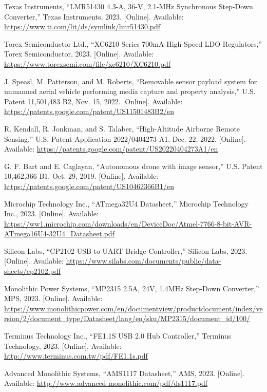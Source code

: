\documentclass[12pt]{article}
\begin{document}
\begin{thebibliography}{99}
Texas Instruments, ``LMR51430 4.3-A, 36-V, 2.1-MHz Synchronous Step-Down Converter,'' Texas Instruments, 2023. [Online]. Available: \url{https://www.ti.com/lit/ds/symlink/lmr51430.pdf}

Torex Semiconductor Ltd., ``XC6210 Series 700mA High-Speed LDO Regulators,'' Torex Semiconductor, 2023. [Online]. Available: \url{https://www.torexsemi.com/file/xc6210/XC6210.pdf}

J. Speasl, M. Patterson, and M. Roberts, ``Removable sensor payload system for unmanned aerial vehicle performing media capture and property analysis,'' U.S. Patent 11,501,483 B2, Nov. 15, 2022. [Online]. Available: \url{https://patents.google.com/patent/US11501483B2/en}

R. Kendall, R. Jonkman, and S. Talaber, ``High-Altitude Airborne Remote Sensing,'' U.S. Patent Application 2022/0404273 A1, Dec. 22, 2022. [Online]. Available: \url{https://patents.google.com/patent/US20220404273A1/en}

G. F. Bart and E. Caglayan, ``Autonomous drone with image sensor,'' U.S. Patent 10,462,366 B1, Oct. 29, 2019. [Online]. Available: \url{https://patents.google.com/patent/US10462366B1/en}

Microchip Technology Inc., ``ATmega32U4 Datasheet,'' Microchip Technology Inc., 2023. [Online]. Available: \url{https://ww1.microchip.com/downloads/en/DeviceDoc/Atmel-7766-8-bit-AVR-ATmega16U4-32U4_Datasheet.pdf}

Silicon Labs, ``CP2102 USB to UART Bridge Controller,'' Silicon Labs, 2023. [Online]. Available: \url{https://www.silabs.com/documents/public/data-sheets/cp2102.pdf}

Monolithic Power Systems, ``MP2315 2.5A, 24V, 1.4MHz Step-Down Converter,'' MPS, 2023. [Online]. Available: \url{https://www.monolithicpower.com/en/documentview/productdocument/index/version/2/document_type/Datasheet/lang/en/sku/MP2315/document_id/100/}

Terminus Technology Inc., ``FE1.1S USB 2.0 Hub Controller,'' Terminus Technology, 2023. [Online]. Available: \url{http://www.terminus.com.tw/pdf/FE1.1s.pdf}

Advanced Monolithic Systems, ``AMS1117 Datasheet,'' AMS, 2023. [Online]. Available: \url{http://www.advanced-monolithic.com/pdf/ds1117.pdf}


\end{thebibliography}
\end{document}
